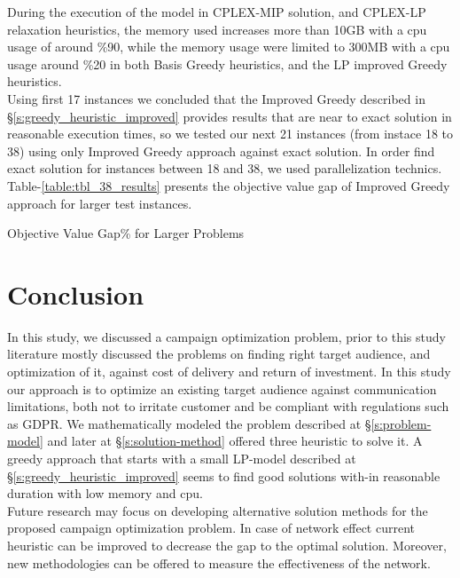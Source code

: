 \documentclass[11pt]{article}
\begin{document}
During the execution of the model in CPLEX-MIP solution, and CPLEX-LP relaxation heuristics, the memory used increases more than 10GB with a cpu usage of around \%90, while the memory usage were limited to 300MB with a cpu usage around \%20 in both Basis Greedy heuristics, and the LP improved Greedy heuristics.\\

Using first 17 instances we concluded that the Improved Greedy described in \S \ref{s:greedy_heuristic_improved} provides results that are near to exact solution in reasonable execution times, so we tested our next 21 instances (from instace 18 to 38) using only Improved Greedy approach against exact solution. In order find exact solution for instances between 18 and 38, we used parallelization technics. Table-\ref{table:tbl_38_results} presents the objective value gap of Improved Greedy approach for larger test instances.

        \begin{table}[htb!]
        \centering
        \caption{Objective Value Gap\% for Larger Problems}\label{table:tbl_38_results}
        \end{table}
         \newpage

\section{Conclusion} \label{s:conclusion}
In this study, we discussed a campaign optimization problem, prior to this study literature mostly discussed the problems on finding right target audience, and optimization of it, against cost of delivery and return of investment. In this study our approach is to optimize an existing target audience against communication limitations, both not to irritate customer and be compliant with regulations such as GDPR. We mathematically modeled the problem described at \S \ref{s:problem-model} and later at \S \ref{s:solution-method} offered three heuristic to solve it. A greedy approach that starts with a small LP-model described at \S \ref{s:greedy_heuristic_improved} seems to find good solutions with-in reasonable duration with low memory and cpu.\\
Future research may focus on developing alternative solution methods for the proposed campaign optimization problem. In case of network effect current heuristic can be improved to decrease the gap to the optimal solution. Moreover, new methodologies can be offered to measure the effectiveness of the network.
\newpage
\end{document}

